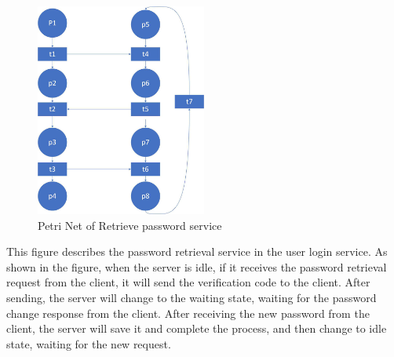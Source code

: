 \documentclass[runningheads]{llncs}
\begin{document}
\begin{figure}[H]
		\centering %
		\includegraphics[width=0.5\textwidth]{./figure/Hyy/petri} %
		\caption{Petri Net of Retrieve password service} %
		\label{petri} %
	\end{figure}
This figure describes the password retrieval service in the user login service. As shown in the figure, when the server is idle, if it receives the password retrieval request from the client, it will send the verification code to the client. After sending, the server will change to the waiting state, waiting for the password change response from the client. After receiving the new password from the client, the server will save it and complete the process, and then change to idle state, waiting for the new request.
\end{document}
